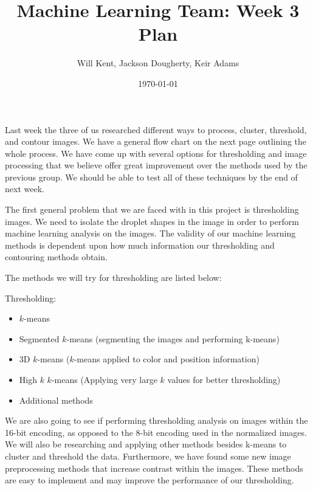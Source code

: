 \documentclass[12pt]{amsart}
\title{Machine Learning Team: Week 3 Plan}
\author{Will Kent, Jackson Dougherty, Keir Adams}
\date{\today}
\begin{document}
\maketitle

Last week the three of us researched different ways to process, cluster, threshold, and contour images. We have a general flow chart on the next page outlining the whole process. We have come up with several options for thresholding and image processing that we believe offer great improvement over the methods used by the previous group. We should be able to test all of these techniques by the end of next week. 

The first general problem that we are faced with in this project is thresholding images. We need to isolate the droplet shapes in the image in order to perform machine learning analysis on the images. The validity of our machine learning methods is dependent upon how much information our thresholding and contouring methods obtain. 

The methods we will try for thresholding are listed below:

Thresholding:
\vspace*{-11pt}
\begin{itemize}
	\item $k$-means
	\item Segmented $k$-means (segmenting the images and performing k-means)
	\item 3D $k$-means ($k$-means applied to color and position information)
	\item High $k$ $k$-means (Applying very large $k$ values for better thresholding)
	\item Additional methods
\end{itemize}

We are also going to see if performing thresholding analysis on images within the 16-bit encoding, as opposed to the 8-bit encoding used in the normalized images. We will also be researching and applying other methods besides k-means to cluster and threshold the data. Furthermore, we have found some new image preprocessing methods that increase contrast within the images. These methods are easy to implement and may improve the performance of our thresholding. 
\end{document}
